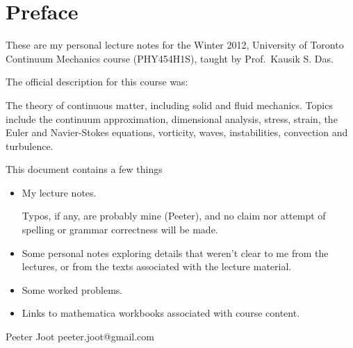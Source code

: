 \chapter*{Preface}\normalsize

These are my personal lecture notes for the Winter 2012, University of Toronto Continuum Mechanics course (PHY454H1S), taught by Prof.\ Kausik S. Das.

The official description for this course was:

The theory of continuous matter, including solid and fluid mechanics.  Topics include the continuum approximation, dimensional analysis, stress, strain, the Euler and Navier-Stokes equations, vorticity, waves, instabilities, convection and turbulence.

This document contains a few things

\begin{itemize}
\item My lecture notes.

Typos, if any, are probably mine (Peeter), and no claim nor attempt of spelling or grammar correctness will be made.

\item Some personal notes exploring details that weren't clear to me from the lectures, or from the texts associated with the lecture material.

\item Some worked problems.

\item Links to mathematica workbooks associated with course content.

\end{itemize}

Peeter Joot  \quad peeter.joot@gmail.com 

